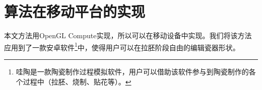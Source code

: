 \chapter{算法在移动平台的实现}

本文方法用OpenGL Compute实现，所以可以在移动设备中实现。我们将该方法应用到了一款安卓软件\footnote{哇陶是一款陶瓷制作过程模拟软件，用户可以借助该软件参与到陶瓷制作的各个过程中（拉胚、烧制、贴花等）。}中，使得用户可以在拉胚阶段自由的编辑瓷器形状。

